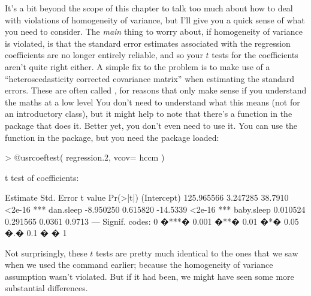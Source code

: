 It's a bit beyond the scope of this chapter to talk too much about how to deal with violations of homogeneity of variance, but I'll give you a quick sense of what you need to consider. The {\it main} thing to worry about, if homogeneity of variance is violated, is that the standard error estimates associated with the regression coefficients are no longer entirely reliable, and so your $t$ tests for the coefficients aren't quite right either. A simple fix to the problem is to make use of a ``heteroscedasticity corrected covariance matrix'' when estimating the standard errors. These are often called , for reasons that only make sense if you understand the maths at a low level You don't need to understand what this means (not for an introductory class), but it might help to note that there's a  function in the  package that does it. Better yet, you don't even need to use it. You can use the  function in the  package, but you need the  package loaded: 
\begin{rblock1}
> @usr{coeftest( regression.2, vcov= hccm )}

t test of coefficients:

              Estimate Std. Error  t value Pr(>|t|)    
(Intercept) 125.965566   3.247285  38.7910   <2e-16 ***
dan.sleep    -8.950250   0.615820 -14.5339   <2e-16 ***
baby.sleep    0.010524   0.291565   0.0361   0.9713    
---
Signif. codes:  0 �***� 0.001 �**� 0.01 �*� 0.05 �.� 0.1 � � 1 
\end{rblock1}
Not surprisingly, these $t$ tests are pretty much identical to the ones that we saw when we used the  command earlier; because the homogeneity of variance assumption wasn't violated. But if it had been, we might have seen some more substantial differences.

